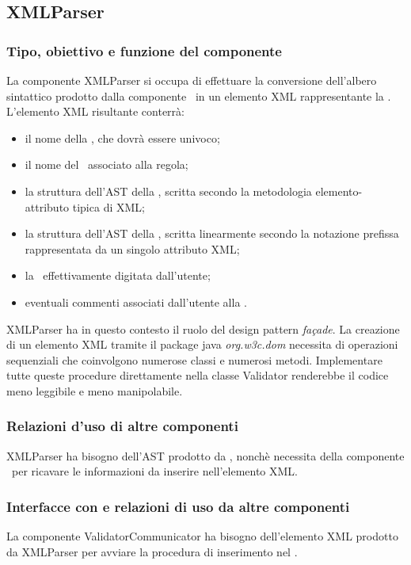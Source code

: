 \documentclass[11pt,titlepage,a4paper]{report}
\begin{document}
\subsection{XMLParser}%
\subsubsection{Tipo, obiettivo e funzione del componente}
La componente XMLParser si occupa di effettuare la conversione dell'albero sintattico prodotto dalla componente \brp\ in un elemento XML rappresentante la \br. L'elemento XML risultante conterr\`a:
\begin{itemize}
 \item il nome della \br, che dovr\`a essere univoco;
 \item il nome del \bo\ associato alla regola;
 \item la struttura dell'AST della \br, scritta secondo la metodologia elemento-attributo tipica di XML;
 \item la struttura dell'AST della \br, scritta linearmente secondo la notazione prefissa rappresentata da un singolo attributo XML;
 \item la \br\ effettivamente digitata dall'utente;
 \item eventuali commenti associati dall'utente alla \br.
\end{itemize}
XMLParser ha in questo contesto il ruolo del design pattern \textit{fa\c{c}ade}. La creazione di un elemento XML tramite il package java \textit{org.w3c.dom} necessita di operazioni sequenziali che coinvolgono numerose classi e numerosi metodi. Implementare tutte queste procedure direttamente nella classe Validator renderebbe il codice meno leggibile e meno manipolabile.
\subsubsection{Relazioni d'uso di altre componenti}
XMLParser ha bisogno dell'AST prodotto da \brp, nonch\`e necessita della componente \br\ per ricavare le informazioni da inserire nell'elemento XML.
\subsubsection{Interfacce con e relazioni di uso da altre componenti}
La componente ValidatorCommunicator ha bisogno dell'elemento XML prodotto da XMLParser per avviare la procedura di inserimento nel \re.
\end{document}
